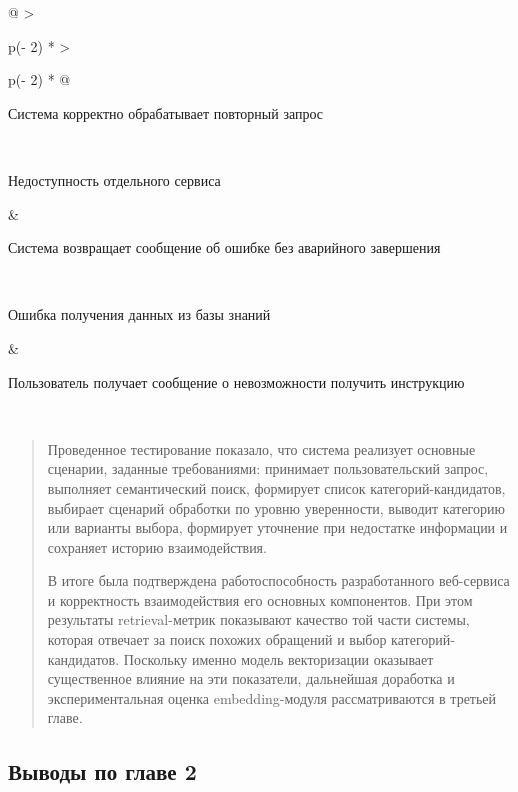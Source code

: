 \documentclass[
]{article}
\begin{document}
\begin{longtable}[]{@{}
  >{\raggedright\arraybackslash}p{(\columnwidth - 2\tabcolsep) * }
  >{\raggedright\arraybackslash}p{(\columnwidth - 2\tabcolsep) * }@{}}
\begin{minipage}[b]{\linewidth}
Система корректно обрабатывает повторный запрос
\end{minipage} \\
\begin{minipage}[b]{\linewidth}\raggedright
Недоступность отдельного сервиса
\end{minipage} & \begin{minipage}[b]{\linewidth}\raggedright
Система возвращает сообщение об ошибке без аварийного завершения
\end{minipage} \\
\begin{minipage}[b]{\linewidth}\raggedright
Ошибка получения данных из базы знаний
\end{minipage} & \begin{minipage}[b]{\linewidth}\raggedright
Пользователь получает сообщение о невозможности получить инструкцию
\end{minipage} \\
\midrule\noalign{}
\endhead
\bottomrule\noalign{}
\endlastfoot
\end{longtable}

\begin{quote}
Проведенное тестирование показало, что система реализует основные
сценарии, заданные требованиями: принимает пользовательский запрос,
выполняет семантический поиск, формирует список категорий-кандидатов,
выбирает сценарий обработки по уровню уверенности, выводит категорию или
варианты выбора, формирует уточнение при недостатке информации и
сохраняет историю взаимодействия.

В итоге была подтверждена работоспособность разработанного веб-сервиса и
корректность взаимодействия его основных компонентов. При этом
результаты retrieval-метрик показывают качество той части системы,
которая отвечает за поиск похожих обращений и выбор
категорий-кандидатов. Поскольку именно модель векторизации оказывает
существенное влияние на эти показатели, дальнейшая доработка и
экспериментальная оценка embedding-модуля рассматриваются в третьей
главе.
\end{quote}

\hypertarget{ux432ux44bux432ux43eux434ux44b-ux43fux43e-ux433ux43bux430ux432ux435-2}{%
\subsection{\texorpdfstring{Выводы по главе 2
}{Выводы по главе 2 }}\label{ux432ux44bux432ux43eux434ux44b-ux43fux43e-ux433ux43bux430ux432ux435-2}}
\end{document}
